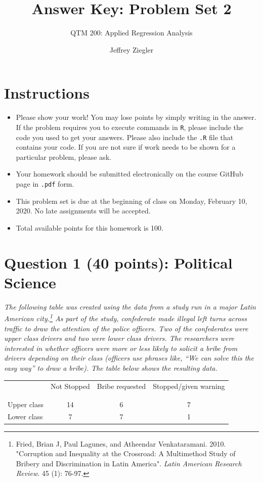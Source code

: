 \documentclass[12pt,letterpaper]{article}
\title{Answer Key: Problem Set 2}
\date{Jeffrey Ziegler}
\author{QTM 200: Applied Regression Analysis}
\begin{document}
	\maketitle
	
	\section*{Instructions}
	\begin{itemize}
		\item Please show your work! You may lose points by simply writing in the answer. If the problem requires you to execute commands in \texttt{R}, please include the code you used to get your answers. Please also include the \texttt{.R} file that contains your code. If you are not sure if work needs to be shown for a particular problem, please ask.
		\item Your homework should be submitted electronically on the course GitHub page in \texttt{.pdf} form.
		\item This problem set is due at the beginning of class on Monday, February 10, 2020. No late assignments will be accepted.
		\item Total available points for this homework is 100.
	\end{itemize}
	
	\vspace{.5cm}
	\section*{Question 1 (40 points): Political Science}
		\vspace{.25cm}
\textit{The following table was created using the data from a study run in a major Latin American city.\footnote{Fried, Brian J, Paul Lagunes, and Atheendar Venkataramani. 2010. "Corruption and Inequality at the Crossroad: A Multimethod Study of Bribery and Discrimination in Latin America". \textit{Latin American Research Review}. 45 (1): 76-97.} As part of the study, confederate made illegal left turns across traffic to draw the attention of the police officers.  Two of the confederates were upper class drivers and two were lower class drivers.  The researchers were interested in whether officers were more or less likely to solicit a bribe from drivers depending on their class (officers use phrases like, ``We can solve this the easy way'' to draw a bribe).  The table below shows the resulting data.}

\begin{table}[h!]
	\centering
	\begin{adjustbox}{max width=.75\textwidth}
		\begin{tabular}{l | c c c }
			& Not Stopped & Bribe requested & Stopped/given warning \\
			\\[-1.8ex] 
			\hline \\[-1.8ex]
			Upper class & 14 & 6 & 7 \\
			Lower class & 7 & 7 & 1 \\
			\hline
		\end{tabular}
	\end{adjustbox}
\end{table}
\end{document}
